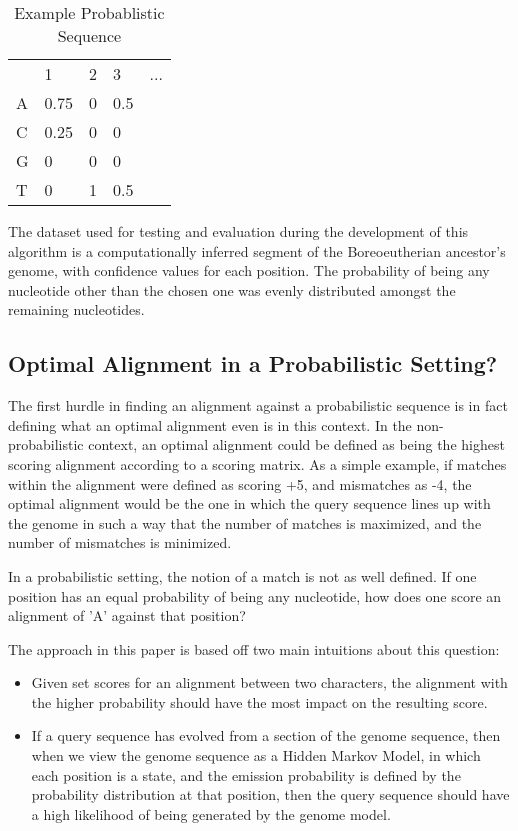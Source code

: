 \documentclass[12pt, conference]{IEEEtran}
\begin{document}
\begin{table}[htbp]
\centering
\caption{Example Probablistic Sequence}
\label{exprob}
\begin{tabular}{lllll}
  & 1    & 2 & 3   & ... \\
A & 0.75 & 0 & 0.5 &     \\
C & 0.25 & 0 & 0   &     \\
G & 0    & 0 & 0   &     \\
T & 0    & 1 & 0.5 &    
\end{tabular}
\end{table}

	The dataset used for testing and evaluation during the development of this algorithm is a computationally inferred segment of the Boreoeutherian ancestor's genome, with confidence values for each position. The probability of being any nucleotide other than the chosen one was evenly distributed amongst the remaining nucleotides.

	\subsection{\textbf{Optimal Alignment in a Probabilistic Setting?}}
	
	The first hurdle in finding an alignment against a probabilistic sequence is in fact defining what an optimal alignment even is in this context. In the non-probabilistic context, an optimal alignment could be defined as being the highest scoring alignment according to a scoring matrix. As a simple example, if matches within the alignment were defined as scoring +5, and mismatches as -4, the optimal alignment would be the one in which the query sequence lines up with the genome in such a way that the number of matches is maximized, and the number of mismatches is minimized.
	
	In a probabilistic setting, the notion of a match is not as well defined. If one position has an equal probability of being any nucleotide, how does one score an alignment of 'A' against that position?
	
	The approach in this paper is based off two main intuitions about this question:
	
	\begin{itemize}
		\item Given set scores for an alignment between two characters, the alignment with the higher probability should have the most impact on the resulting score.
		\item If a query sequence has evolved from a section of the genome sequence, then when we view the genome sequence as a Hidden Markov Model, in which each position is a state, and the emission probability is defined by the probability distribution at that position, then the query sequence should have a high likelihood of being generated by the genome model.
	\end{itemize}
\end{document}

